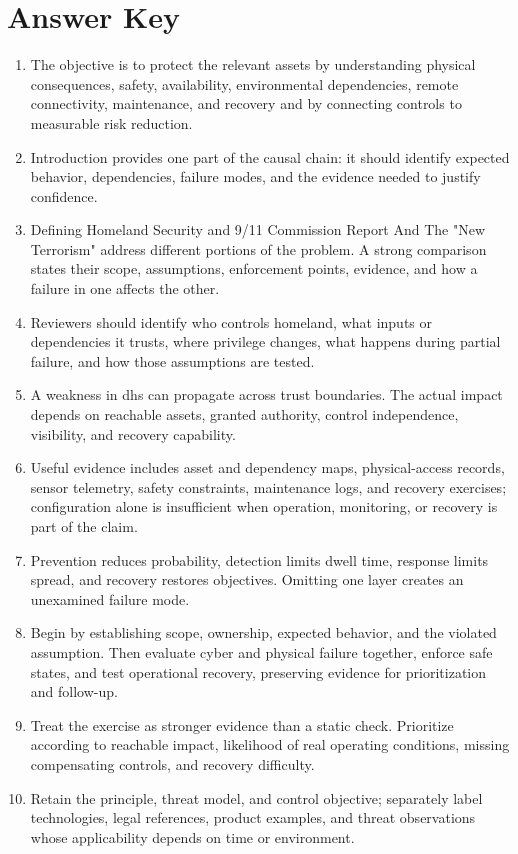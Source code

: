 \documentclass[11pt]{article}
\begin{document}
\section*{Answer Key}
\begin{enumerate}
\item The objective is to protect the relevant assets by understanding physical consequences, safety, availability, environmental dependencies, remote connectivity, maintenance, and recovery and by connecting controls to measurable risk reduction.
\item Introduction provides one part of the causal chain: it should identify expected behavior, dependencies, failure modes, and the evidence needed to justify confidence.
\item Defining Homeland Security and 9/11 Commission Report And The "New Terrorism" address different portions of the problem. A strong comparison states their scope, assumptions, enforcement points, evidence, and how a failure in one affects the other.
\item Reviewers should identify who controls homeland, what inputs or dependencies it trusts, where privilege changes, what happens during partial failure, and how those assumptions are tested.
\item A weakness in dhs can propagate across trust boundaries. The actual impact depends on reachable assets, granted authority, control independence, visibility, and recovery capability.
\item Useful evidence includes asset and dependency maps, physical-access records, sensor telemetry, safety constraints, maintenance logs, and recovery exercises; configuration alone is insufficient when operation, monitoring, or recovery is part of the claim.
\item Prevention reduces probability, detection limits dwell time, response limits spread, and recovery restores objectives. Omitting one layer creates an unexamined failure mode.
\item Begin by establishing scope, ownership, expected behavior, and the violated assumption. Then evaluate cyber and physical failure together, enforce safe states, and test operational recovery, preserving evidence for prioritization and follow-up.
\item Treat the exercise as stronger evidence than a static check. Prioritize according to reachable impact, likelihood of real operating conditions, missing compensating controls, and recovery difficulty.
\item Retain the principle, threat model, and control objective; separately label technologies, legal references, product examples, and threat observations whose applicability depends on time or environment.
\end{enumerate}
\end{document}
